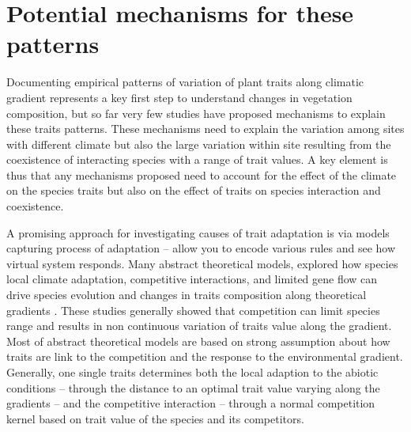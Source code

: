 \documentclass[a4paper,11pt]{article}
\begin{document}
\clearpage

\section{Potential mechanisms for these patterns}

Documenting empirical patterns of variation of plant traits along climatic gradient represents a key first step to understand changes in vegetation composition, but so far very few studies have proposed mechanisms to explain these traits patterns. These mechanisms need to explain the variation among sites with different climate but also the large variation within site resulting from the coexistence of interacting species with a range of trait values. A key element is thus that any mechanisms proposed need to account for the effect of the climate on the species traits but also on the effect of traits on species interaction and coexistence.

A promising approach for investigating causes of trait adaptation is via models capturing process of adaptation -- allow you to encode various rules and see how virtual system responds. Many abstract theoretical models, explored how species local climate adaptation, competitive interactions, and limited gene flow can drive species evolution and changes in traits composition along theoretical gradients \citep{Case-2000,Doebeli-2003,Goldberg-2006,Leimar-2008}. These studies generally showed that competition can limit species range and results in non continuous variation of traits value along the gradient. Most of abstract theoretical models are based on strong assumption about how traits are link to the competition and the response to the environmental gradient. Generally, one single traits determines both the local adaption to the abiotic conditions -- through the distance to an optimal trait value varying along the gradients -- and the competitive interaction -- through a normal competition kernel based on trait value of the species and its competitors\citep[see][]{Case-2000}.
\end{document}
